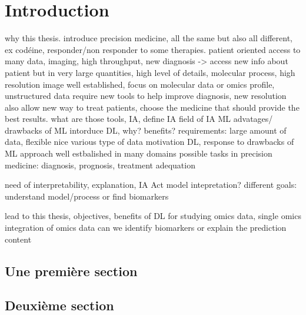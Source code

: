 \documentclass[../main.tex]{subfiles}
\begin{document}

\chapter{Introduction}

\minitocpage

why this thesis.
introduce precision medicine,
all the same but also all different, ex codéine, responder/non responder to some therapies.
patient oriented
access to many data, imaging, high throughput, new diagnosis -> access new info about patient but in very large quantities, high level of details, molecular process, high resolution
image well established, focus on molecular data or omics profile, unstructured data
require new tools to help improve diagnosis, new resolution also allow new way to treat patients, choose the medicine that should provide the best results.
what are those tools, IA, define IA field of IA ML
advatages/ drawbacks of ML
intorduce DL, why? benefits? requirements: large amount of data, flexible nice various type of data
motivation DL, response to drawbacks of ML approach
well estbalished in many domains
possible tasks in precision medicine: diagnosis, prognosis, treatment adequation


need of interpretability, explanation, IA Act
model intepretation?
different goals: understand model/process or find biomarkers

lead to this thesis, objectives,
benefits of DL for studying omics data, single omics
integration of omics data
can we identify biomarkers or explain the prediction
content


\section{Une première section}
\section{Deuxième section}
\end{document}
